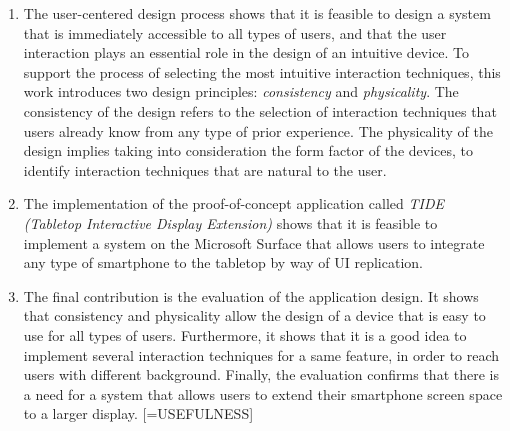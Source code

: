 \begin{enumerate}

\item The user-centered design process shows that it is feasible to design a system that is immediately accessible to all types of users, and that the user interaction plays an essential role in the design of an intuitive device.
To support the process of selecting the most intuitive interaction techniques, this work introduces two design principles: \emph{consistency} and \emph{physicality}.
The consistency of the design refers to the selection of interaction techniques that users already know from any type of prior experience.
The physicality of the design implies taking into consideration the form factor of the devices, to identify interaction techniques that are natural to the user.

\item The implementation of the proof-of-concept application called \emph{TIDE (Tabletop Interactive Display Extension)} shows that it is feasible to implement a system on the Microsoft Surface that allows users to integrate any type of smartphone to the tabletop by way of UI replication.

\item The final contribution is the evaluation of the application design.
It shows that consistency and physicality allow the design of a device that is easy to use for all types of users.
Furthermore, it shows that it is a good idea to implement several interaction techniques for a same feature, in order to reach users with different background.
Finally, the evaluation confirms that there is a need for a system that allows users to extend their smartphone screen space to a larger display. [=USEFULNESS]

\end{enumerate}

